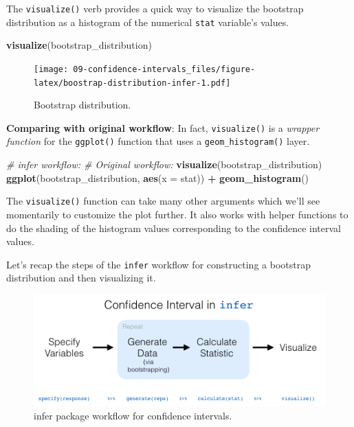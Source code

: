 \documentclass[
]{book}
\newenvironment{Shaded}{\begin{snugshade}}{\end{snugshade}}
\newcommand{\CommentTok}[1]{\textcolor[rgb]{0.56,0.35,0.01}{\textit{#1}}}
\newcommand{\DataTypeTok}[1]{\textcolor[rgb]{0.13,0.29,0.53}{#1}}
\newcommand{\KeywordTok}[1]{\textcolor[rgb]{0.13,0.29,0.53}{\textbf{#1}}}
\newcommand{\NormalTok}[1]{#1}
\newcommand{\OperatorTok}[1]{\textcolor[rgb]{0.81,0.36,0.00}{\textbf{#1}}}
\newcommand{\StringTok}[1]{\textcolor[rgb]{0.31,0.60,0.02}{#1}}
\begin{document}
The \texttt{visualize()}  verb provides a quick way to visualize the bootstrap distribution as a histogram of the numerical \texttt{stat} variable's values.

\begin{Shaded}
\begin{Highlighting}[]
\KeywordTok{visualize}\NormalTok{(bootstrap_distribution)}
\end{Highlighting}
\end{Shaded}

\begin{figure}
\centering
\texttt{[image: 09-confidence-intervals\_files/figure-latex/boostrap-distribution-infer-1.pdf]}
\caption{\label{fig:boostrap-distribution-infer}Bootstrap distribution.}
\end{figure}

\textbf{Comparing with original workflow}: In fact, \texttt{visualize()} is a \emph{wrapper function} for the \texttt{ggplot()} function that uses a \texttt{geom\_histogram()} layer.

\begin{Shaded}
\begin{Highlighting}[]
\CommentTok{# infer workflow:                    # Original workflow:}
\KeywordTok{visualize}\NormalTok{(bootstrap_distribution)    }\KeywordTok{ggplot}\NormalTok{(bootstrap_distribution, }
                                            \KeywordTok{aes}\NormalTok{(}\DataTypeTok{x =}\NormalTok{ stat)) }\OperatorTok{+}
\StringTok{                                       }\KeywordTok{geom_histogram}\NormalTok{()}
\end{Highlighting}
\end{Shaded}

The \texttt{visualize()} function can take many other arguments which we'll see momentarily to customize the plot further. It also works with helper functions to do the shading of the histogram values corresponding to the confidence interval values.

Let's recap the steps of the \texttt{infer} workflow for constructing a bootstrap distribution and then visualizing it.

\begin{figure}

{\centering \includegraphics[width=1\linewidth]{images/flowcharts/infer/ci_diagram} 

}

\caption{infer package workflow for confidence intervals.}\label{fig:infer-workflow-ci}
\end{figure}
\end{document}
